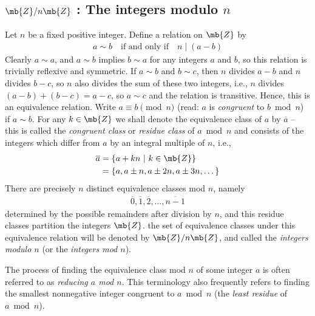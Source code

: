 \subsection{\texorpdfstring{$\mb{Z}/n\mb{Z}$}{Z/nZ} : The integers modulo \texorpdfstring{$n$}{n}}
Let $n$ be a fixed positive integer. Define a relation on $\mb{Z}$ by
\begin{align*}
    a\sim b\quad\text{if and only if}\quad n\mid (a-b)
\end{align*}
Clearly $a\sim a$, and $a\sim b$ implies $b\sim a$ for any integers $a$ and $b$, so this relation
is trivially reflexive and symmetric. If $a\sim b$ and $b\sim c$, then $n$ divides $a-b$ and $n$ divides $b-c$,
so $n$ also divides the sum of these two integers, i.e., $n$ divides $(a-b)+(b-c) = a-c$, 
so $a\sim c$ and the relation is transitive.
Hence, this is an equivalence relation. Write $a\equiv b\pmod{n}$ (read: $a$ is {\sl congruent} to $b\bmod{n}$) if $a\sim b$.
For any $k\in\mb{Z}$ we shall denote the equivalence class of $a$ by $\overline{a}$ -- this is called the {\sl congruent class}
or {\sl residue class} of $a\bmod{n}$ and consists of the integers which differ from $a$ by an integral multiple of $n$, i.e.,
\begin{align*}
    \overline{a} &= \{a+kn\ |\ k\in\mb{Z}\}\\
    &= \{a, a\pm n, a\pm 2n, a\pm 3n, \dots\}
\end{align*}
There are precisely $n$ distinct equivalence classes mod $n$, namely
\begin{align*}
    \overline{0}, \overline{1}, \overline{2}, \dots, \overline{n-1}
\end{align*}
\newpage
\thispagestyle{evenpagestyle}
determined by the possible remainders after division by $n$, and this residue classes
partition the integers $\mb{Z}$. the set of equivalence classes under this equivalence relation
will be denoted by $\mb{Z}/n\mb{Z}$, and called the {\sl integers modulo $n$} (or the {\sl integers mod $n$}).

The process of finding the equivalence class mod $n$ of some integer $a$ is often
referred to as {\sl reducing $a$ mod $n$}. This terminology also frequently refers to finding the smallest
nonnegative integer congruent to $a\bmod{n}$ (the {\sl least residue} of $a\bmod n$).

